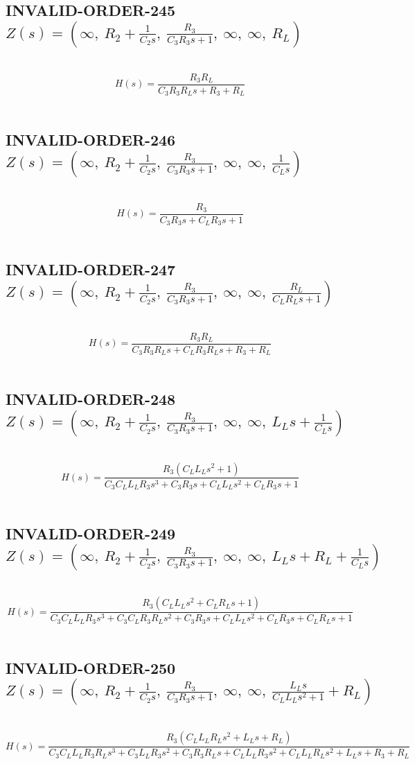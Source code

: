 \documentclass{article}
\begin{document}
\subsection{INVALID-ORDER-245 $Z(s) = \left( \infty, \  R_{2} + \frac{1}{C_{2} s}, \  \frac{R_{3}}{C_{3} R_{3} s + 1}, \  \infty, \  \infty, \  R_{L}\right)$ } \ 
\textbf{\[H(s) = \frac{R_{3} R_{L}}{C_{3} R_{3} R_{L} s + R_{3} + R_{L}}\] } \ 
\subsection{INVALID-ORDER-246 $Z(s) = \left( \infty, \  R_{2} + \frac{1}{C_{2} s}, \  \frac{R_{3}}{C_{3} R_{3} s + 1}, \  \infty, \  \infty, \  \frac{1}{C_{L} s}\right)$ } \ 
\textbf{\[H(s) = \frac{R_{3}}{C_{3} R_{3} s + C_{L} R_{3} s + 1}\] } \ 
\subsection{INVALID-ORDER-247 $Z(s) = \left( \infty, \  R_{2} + \frac{1}{C_{2} s}, \  \frac{R_{3}}{C_{3} R_{3} s + 1}, \  \infty, \  \infty, \  \frac{R_{L}}{C_{L} R_{L} s + 1}\right)$ } \ 
\textbf{\[H(s) = \frac{R_{3} R_{L}}{C_{3} R_{3} R_{L} s + C_{L} R_{3} R_{L} s + R_{3} + R_{L}}\] } \ 
\subsection{INVALID-ORDER-248 $Z(s) = \left( \infty, \  R_{2} + \frac{1}{C_{2} s}, \  \frac{R_{3}}{C_{3} R_{3} s + 1}, \  \infty, \  \infty, \  L_{L} s + \frac{1}{C_{L} s}\right)$ } \ 
\textbf{\[H(s) = \frac{R_{3} \left(C_{L} L_{L} s^{2} + 1\right)}{C_{3} C_{L} L_{L} R_{3} s^{3} + C_{3} R_{3} s + C_{L} L_{L} s^{2} + C_{L} R_{3} s + 1}\] } \ 
\subsection{INVALID-ORDER-249 $Z(s) = \left( \infty, \  R_{2} + \frac{1}{C_{2} s}, \  \frac{R_{3}}{C_{3} R_{3} s + 1}, \  \infty, \  \infty, \  L_{L} s + R_{L} + \frac{1}{C_{L} s}\right)$ } \ 
\textbf{\[H(s) = \frac{R_{3} \left(C_{L} L_{L} s^{2} + C_{L} R_{L} s + 1\right)}{C_{3} C_{L} L_{L} R_{3} s^{3} + C_{3} C_{L} R_{3} R_{L} s^{2} + C_{3} R_{3} s + C_{L} L_{L} s^{2} + C_{L} R_{3} s + C_{L} R_{L} s + 1}\] } \ 
\subsection{INVALID-ORDER-250 $Z(s) = \left( \infty, \  R_{2} + \frac{1}{C_{2} s}, \  \frac{R_{3}}{C_{3} R_{3} s + 1}, \  \infty, \  \infty, \  \frac{L_{L} s}{C_{L} L_{L} s^{2} + 1} + R_{L}\right)$ } \ 
\textbf{\[H(s) = \frac{R_{3} \left(C_{L} L_{L} R_{L} s^{2} + L_{L} s + R_{L}\right)}{C_{3} C_{L} L_{L} R_{3} R_{L} s^{3} + C_{3} L_{L} R_{3} s^{2} + C_{3} R_{3} R_{L} s + C_{L} L_{L} R_{3} s^{2} + C_{L} L_{L} R_{L} s^{2} + L_{L} s + R_{3} + R_{L}}\] } \ 
\end{document}
